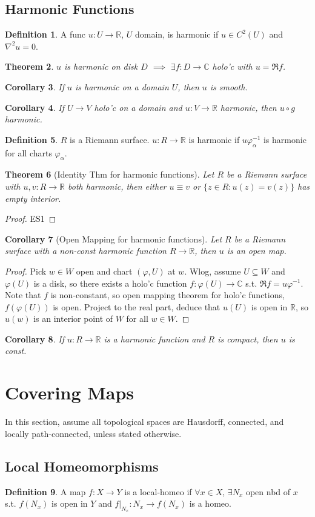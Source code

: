 \documentclass{article}
\theoremstyle{definition}
\newtheorem{defn}{Definition}[section]
\theoremstyle{remark}
\theoremstyle{plain}
\newtheorem{thm}[defn]{Theorem}
\newtheorem{crly}[defn]{Corollary}
\newcommand{\RR}{\mathbb{R}}
\newcommand{\CC}{\mathbb{C}}
\begin{document}
\subsection{Harmonic Functions}
\begin{defn}
    A func $u:U\to\RR$, $U$ domain, is harmonic if $u\in C^2(U)$ and $\nabla^2u=0$.
\end{defn}
\begin{thm}
    $u$ is harmonic on disk $D$ $\implies$ $\exists f:D\to\CC$ holo'c with $u=\Re f$.
\end{thm}
\begin{crly}
    If $u$ is harmonic on a domain $U$, then $u$ is smooth.
\end{crly}
\begin{crly}
    If $U\to V$ holo'c on a domain and $u:V\to\RR$ harmonic, then $u\circ g$ harmonic.
\end{crly}
\begin{defn}
    $R$ is a Riemann surface. $u:R\to\RR$ is harmonic if $u\varphi_\alpha^{-1}$ is harmonic for all charts $\varphi_\alpha$.
\end{defn}
\begin{thm}[Identity Thm for harmonic functions]
    Let $R$ be a Riemann surface with $u,v:R\to\RR$ both harmonic, then either $u\equiv v$ or $\{z\in R:u(z)=v(z)\}$ has empty interior.
\end{thm}
\begin{proof}
    ES1
\end{proof}
\begin{crly}[Open Mapping for harmonic functions]
    Let $R$ be a Riemann surface with a non-const harmonic function $R\to \RR$, then $u$ is an open map.
\end{crly}
\begin{proof}
    Pick $w\in W$ open and chart $(\varphi, U)$ at $w$. Wlog, assume $U\subseteq W$ and $\varphi(U)$ is a disk, so there exists a holo'c function $f:\varphi(U)\to\CC$ s.t. $\Re f=u\varphi^{-1}$. Note that $f$ is non-constant, so open mapping theorem for holo'c functions, $f(\varphi(U))$ is open. Project to the real part, deduce that $u(U)$ is open in $\RR$, so $u(w)$ is an interior point of $W$ for all $w\in W$.
\end{proof}
\begin{crly}
    If $u:R\to\RR$ is a harmonic function and $R$ is compact, then $u$ is const.
\end{crly}
\section{Covering Maps}
In this section, assume all topological spaces are Hausdorff, connected, and locally path-connected, unless stated otherwise.
\subsection{Local Homeomorphisms}
\begin{defn}
    A map $f:X\to Y$ is a local-homeo if $\forall x\in X$, $\exists N_x$ open nbd of $x$ s.t. $f(N_x)$ is open in $Y$ and $f|_{N_x}:N_x\to f(N_x)$ is a homeo.
\end{defn}
\end{document}
